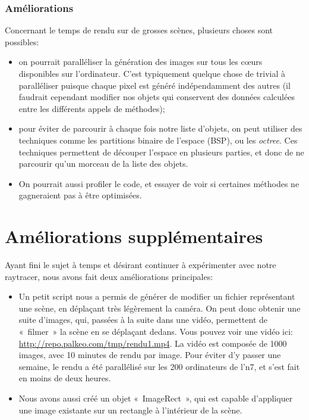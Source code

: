 \documentclass[a4paper]{article}
\begin{document}
    \subsubsection{Améliorations}
    Concernant le temps de rendu sur de grosses scènes, plusieurs choses sont possibles:
    \begin{itemize}
      \item on pourrait paralléliser la génération des images sur tous les
        cœurs disponibles sur l'ordinateur. C'est typiquement quelque chose de
        trivial à paralléliser puisque chaque pixel est généré indépendamment
        des autres (il faudrait cependant modifier nos objets qui conservent
        des données calculées entre les différents appels de méthodes);
      \item pour éviter de parcourir à chaque fois notre liste d'objets, on
        peut utiliser des techniques comme les partitions binaire de l'espace
        (BSP), ou les \textit{octree}. Ces techniques permettent de découper
        l'espace en plusieurs parties, et donc de ne parcourir qu'un morceau
        de la liste des objets.
      \item On pourrait aussi profiler le code, et essayer de voir si
        certaines méthodes ne gagneraient pas à être optimisées.
    \end{itemize}
    
\section{Améliorations supplémentaires}
Ayant fini le sujet à temps et désirant continuer à expérimenter avec notre raytracer, nous avons fait deux améliorations principales:
\begin{itemize}
    \item Un petit script nous a permis de générer de modifier un fichier représentant une scène, en déplaçant très légèrement la caméra.
              On peut donc obtenir une suite d'images, qui, passées à la suite dans une vidéo, permettent de «~filmer~» la scène en se déplaçant dedans.
              Vous pouvez voir une vidéo ici: \url{http://repo.palkeo.com/tmp/rendu1.mp4}.
              La vidéo est composée de 1000 images, avec 10 minutes de rendu par image. Pour éviter d'y passer une semaine, le rendu a été parallélisé sur les 200 ordinateurs de l'n7, et s'est fait en moins de deux heures.
    \item Nous avons aussi créé un objet «~ImageRect~», qui est capable d'appliquer une image existante sur un rectangle à l'intérieur de la scène.
\end{itemize}
\end{document}
